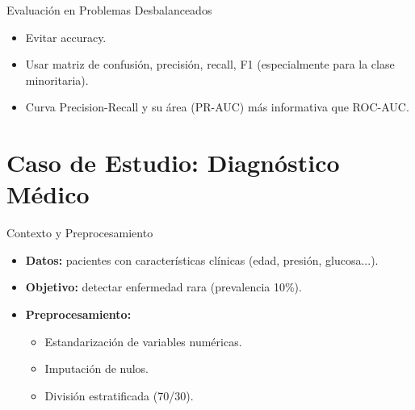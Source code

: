 \documentclass[aspectratio=169, 10pt, xcolor=table]{beamer}
\begin{document}
\begin{frame}{Evaluación en Problemas Desbalanceados}
    \begin{itemize}
        \item Evitar accuracy.
        \item Usar matriz de confusión, precisión, recall, F1 (especialmente para la clase minoritaria).
        \item Curva Precision-Recall y su área (PR-AUC) más informativa que ROC-AUC.
    \end{itemize}
\end{frame}

\section{Caso de Estudio: Diagnóstico Médico}

\begin{frame}{Contexto y Preprocesamiento}
    \begin{itemize}
        \item \textbf{Datos:} pacientes con características clínicas (edad, presión, glucosa...).
        \item \textbf{Objetivo:} detectar enfermedad rara (prevalencia 10\%).
        \item \textbf{Preprocesamiento:}
        \begin{itemize}
            \item Estandarización de variables numéricas.
            \item Imputación de nulos.
            \item División estratificada (70/30).
        \end{itemize}
    \end{itemize}
\end{frame}
\end{document}
